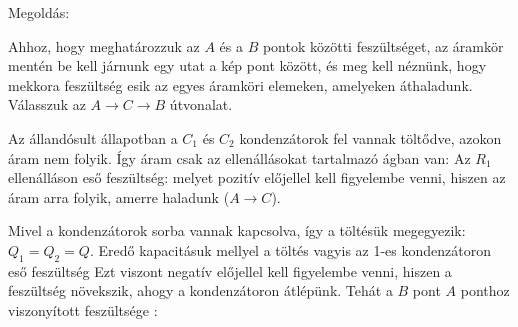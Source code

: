 
\ifdefined\megoldas

 Megoldás: 

 Ahhoz, hogy meghatározzuk az $A$ és a $B$ pontok közötti feszültséget, az áramkör mentén be kell járnunk egy utat a kép pont között, és meg kell néznünk, hogy mekkora feszültség esik az egyes áramköri elemeken, amelyeken áthaladunk. Válasszuk az $A\to C\to B$ útvonalat.

 Az állandósult állapotban a $C_1$ és $C_2$ kondenzátorok fel vannak töltődve, azokon áram nem folyik. Így áram csak az ellenállásokat tartalmazó ágban van:
 Az $R_1$ ellenálláson eső feszültség:
 melyet pozitív előjellel kell figyelembe venni, hiszen az áram arra folyik, amerre haladunk ($A\to C$).

 Mivel a kondenzátorok sorba vannak kapcsolva, így a töltésük megegyezik: $Q_1=Q_2=Q$. Eredő kapacitásuk
 mellyel a töltés
 vagyis az 1-es kondenzátoron eső feszültség
 Ezt viszont negatív előjellel kell figyelembe venni, hiszen a feszültség növekszik,  ahogy a kondenzátoron átlépünk. Tehát a $B$ pont $A$ ponthoz viszonyított feszültsége :

\fi
